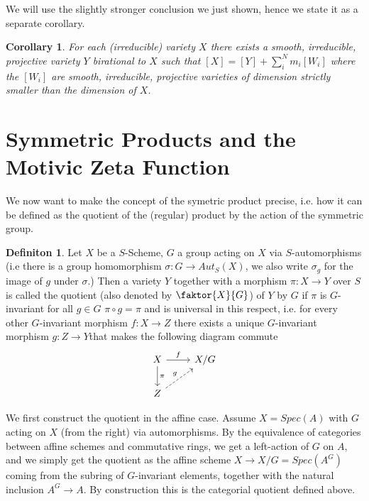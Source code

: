 \documentclass[11pt, a4paper, german]{article}
\theoremstyle{plain}
\newtheorem{corollary}[theorem]{Corollary}
\theoremstyle{definition}
\newtheorem{definition}[theorem]{Definiton}
\begin{document}
We will use the slightly stronger conclusion we just shown, hence we state it as a separate corollary.

\begin{corollary}
    \label{decomp}
    For each (irreducible) variety $X$ there exists a smooth, irreducible, projective variety $Y$ birational
    to $X$ such that $[X] = [Y] + \sum_i^N m_i[W_i]$ where the $[W_i]$ are smooth, irreducible, projective varieties of dimension strictly
    smaller than the dimension of $X$.
\end{corollary}




\section{Symmetric Products and the Motivic Zeta Function}

We now want to make the concept of the symetric product precise, i.e. how it can be defined as the quotient of the (regular) product by the
action of the symmetric group.

\begin{definition}
    Let $X$ be a $S$-Scheme, $G$ a group acting on $X$ via $S$-automorphisms (i.e there is a group homomorphism $\sigma \colon G \to Aut_S(X)$,
    we also write $\sigma_g$ for the image of $g$ under $\sigma$.) 
    Then a variety $Y$ together with a morphism $\pi \colon X \to Y$
    over $S$ is called the quotient (also denoted by $\faktor{X}{G}$) of $Y$ by $G$ if $\pi$ is $G$-invariant for all $g \in G$ 
    $\pi \circ g = \pi$ and is universal in this respect, i.e. for every other $G$-invariant morphism $f \colon X \to Z$ there exists a unique
    $G$-invariant morphism $g \colon Z \to Y$that makes the following diagram commute
    \begin{equation*}
        \begin{tikzcd}
            X \arrow{r}{f} \arrow{d}{\pi} & X/G \\
            Z \arrow[dashrightarrow]{ur}{g}
        \end{tikzcd}
    \end{equation*}
\end{definition}

We first construct the quotient in the affine case. Assume $X = Spec(A)$ with $G$ acting on $X$ (from the right) via automorphisms.
By the equivalence of categories between affine schemes and commutative rings, we get a left-action of $G$ on $A$, and we simply get the quotient
as the affine scheme $X \to X/G = Spec(A^G)$ coming from the subring of $G$-invariant elements, together with the natural inclusion $A^G \to A$.
By construction this is the categorial quotient defined above.
\end{document}
